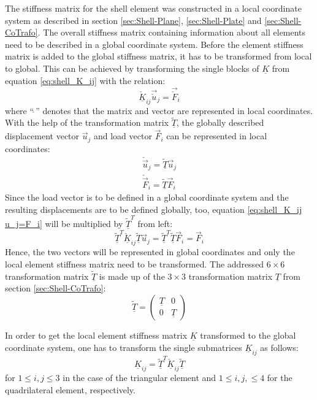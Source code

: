  The stiffness matrix for the shell element was constructed in a local coordinate system as described in section \ref{sec:Shell-Plane}, \ref{sec:Shell-Plate} and \ref{sec:Shell-CoTrafo}. The overall stiffness matrix containing information about all elements need to be described in a global coordinate system. Before the element stiffness matrix is added to the global stiffness matrix, it has to be transformed from local to global. This can be achieved by transforming the single blocks of $\underline{K}$ from equation \eqref{eq:shell_K_ij} with the relation:
 \begin{equation}\label{eq:shell_K_ij u_j=F_i}
 \underline{\check{K}}_{ij} \vec{\check{u}}_j = \vec{\check{F}}_i
 \end{equation}
 where ``\;$\check{\ }$\;'' denotes that the matrix and vector are represented in local coordinates. With the help of the transformation matrix $\underline{\tilde{T}}$, the globally described displacement vector $\vec{u}_j$ and load vector $\vec{F}_i$ can be represented in local coordinates:
 \begin{align}
 \check{\vec{u}}_j = \underline{\tilde{T}} \vec{u}_j\\
 \check{\vec{F}}_i = \underline{\tilde{T}} \vec{F}_i
 \end{align}
 Since the load vector is to be defined in a global coordinate system and the resulting displacements are to be defined globally, too, equation \eqref{eq:shell_K_ij u_j=F_i} will be multiplied by $\underline{\tilde{T}}^T$ from left:
 \begin{equation}
 \underline{\tilde{T}}^T \underline{\check{K}}_{ij} \underline{\tilde{T}} \vec{u}_j = \underline{\tilde{T}}^T \underline{\tilde{T}} \vec{F}_i = \vec{F}_i
 \end{equation}
 Hence, the two vectors will be represented in global coordinates and only the local element stiffness matrix need to be transformed. The addressed $6\!\times\!6$ transformation matrix $\underline{\tilde{T}}$ is made up of the $3\!\times\!3$ transformation matrix $\underline{T}$ from section \ref{sec:Shell-CoTrafo}:
 \begin{equation}\label{eq:trafoTtilde}
 \underline{\tilde{T}} = \begin{pmatrix}
 \underline{T} & 0\\
 0 & \underline{T}
 \end{pmatrix}
 \end{equation}
 
 In order to get the local element stiffness matrix $\underline{K}$ transformed to the global coordinate system, one has to transform the single submatrices $\underline{K}_{ij}$ as follows:
 \begin{equation}\label{eq:Kij=Tt Kij T}
 \underline{K}_{ij} = \underline{\tilde{T}}^T \underline{\check{K}}_{ij} \underline{\tilde{T}}
 \end{equation}
 for $1 \leq i,j \leq 3$ in the case of the triangular element and $1 \leq i,j, \leq 4$ for the quadrilateral element, respectively.
 \newpage